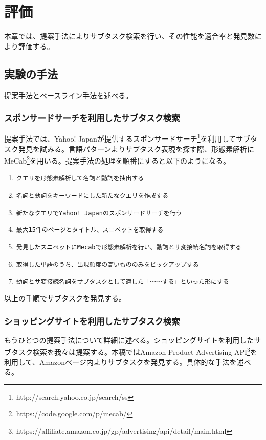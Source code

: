 \documentclass[submit,techreq]{ipsj}
\def\|{\verb|}
\begin{document}
%5章
\section{評価}
\label{sec:evaluate}
本章では、提案手法によりサブタスク検索を行い、その性能を適合率と発見数により評価する。

%5.1
\subsection{実験の手法}
提案手法とベースライン手法を述べる。

%5.1.1
\subsubsection{スポンサードサーチを利用したサブタスク検索}

提案手法では、Yahoo! Japanが提供するスポンサードサーチ\footnote{http://search.yahoo.co.jp/search/ss}を利用してサブタスク発見を試みる。言語パターンよりサブタスク表現を探す際、形態素解析にMeCab\footnote{https://code.google.com/p/mecab/}を用いる。提案手法の処理を順番にすると以下のようになる。

\begin{enumerate}
\item \|クエリを形態素解析して名詞と動詞を抽出する|
\item \|名詞と動詞をキーワードにした新たなクエリを作成する|
\item \|新たなクエリでYahoo! Japanのスポンサードサーチを行う|
\item \|最大15件のページとタイトル、スニペットを取得する|
\item \|発見したスニペットにMecabで形態素解析を行い、動詞とサ変接続名詞を取得する|
\item \|取得した単語のうち、出現頻度の高いもののみをピックアップする|
\item \|動詞とサ変接続名詞をサブタスクとして適した「〜〜する」といった形にする|
\end{enumerate}

以上の手順でサブタスクを発見する。

\subsubsection{ショッピングサイトを利用したサブタスク検索}
もうひとつの提案手法について詳細に述べる。ショッピングサイトを利用したサブタスク検索を我々は提案する。本稿ではAmazon Product Advertising API\footnote{https://affiliate.amazon.co.jp/gp/advertising/api/detail/main.html}を利用して、Amazonページ内よりサブタスクを発見する。具体的な手法を述べる。
\end{document}
